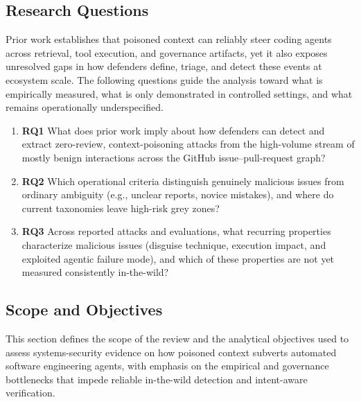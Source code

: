 \documentclass[11pt, a4paper]{article}
\begin{document}
\subsection{\textbf{Research Questions}}
Prior work establishes that poisoned context can reliably steer coding agents across retrieval, tool execution, and governance artifacts, yet it also exposes unresolved gaps in how defenders define, triage, and detect these events at ecosystem scale. The following questions guide the analysis toward what is empirically measured, what is only demonstrated in controlled settings, and what remains operationally underspecified.
\begin{enumerate}
    \item \textbf{RQ1} What does prior work imply about how defenders can detect and extract zero-review, context-poisoning attacks from the high-volume stream of mostly benign interactions across the GitHub issue--pull-request graph?
    \item \textbf{RQ2} Which operational criteria distinguish genuinely malicious issues from ordinary ambiguity (e.g., unclear reports, novice mistakes), and where do current taxonomies leave high-risk grey zones?
    \item \textbf{RQ3} Across reported attacks and evaluations, what recurring properties characterize malicious issues (disguise technique, execution impact, and exploited agentic failure mode), and which of these properties are not yet measured consistently in-the-wild?
\end{enumerate}

\subsection{\textbf{Scope and Objectives}}
This section defines the scope of the review and the analytical objectives used to assess systems-security evidence on how poisoned context subverts automated software engineering agents, with emphasis on the empirical and governance bottlenecks that impede reliable in-the-wild detection and intent-aware verification.
\end{document}

